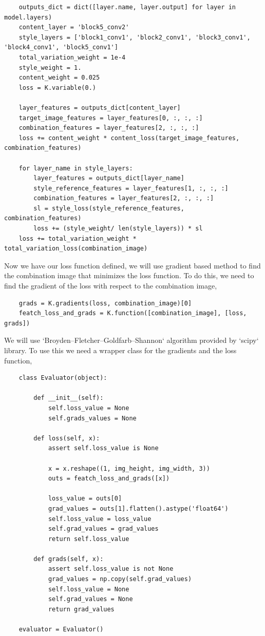 \documentclass[graybox]{svmult}
\begin{document}
\begin{verbatim}
    outputs_dict = dict([layer.name, layer.output] for layer in model.layers)
    content_layer = 'block5_conv2'
    style_layers = ['block1_conv1', 'block2_conv1', 'block3_conv1', 'block4_conv1', 'block5_conv1']
    total_variation_weight = 1e-4
    style_weight = 1.
    content_weight = 0.025
    loss = K.variable(0.)

    layer_features = outputs_dict[content_layer]
    target_image_features = layer_features[0, :, :, :]
    combination_features = layer_features[2, :, :, :]
    loss += content_weight * content_loss(target_image_features, combination_features)

    for layer_name in style_layers:
        layer_features = outputs_dict[layer_name]
        style_reference_features = layer_features[1, :, :, :]
        combination_features = layer_features[2, :, :, :]
        sl = style_loss(style_reference_features, combination_features)
        loss += (style_weight/ len(style_layers)) * sl
    loss += total_variation_weight * total_variation_loss(combination_image)
\end{verbatim}

Now we have our loss function defined, we will use gradient based method to find the combination image that minimizes the loss function. To do this, we need to find the gradient of the loss with respect to the combination image,

\begin{verbatim}
    grads = K.gradients(loss, combination_image)[0]
    featch_loss_and_grads = K.function([combination_image], [loss, grads])
\end{verbatim}

We will use `Broyden–Fletcher–Goldfarb–Shannon` algorithm provided by `scipy` library. To use this we need a wrapper class for the gradients and the loss function,

\begin{verbatim}
    class Evaluator(object):

        def __init__(self):
            self.loss_value = None
            self.grads_values = None

        def loss(self, x):
            assert self.loss_value is None

            x = x.reshape((1, img_height, img_width, 3))
            outs = featch_loss_and_grads([x])

            loss_value = outs[0]
            grad_values = outs[1].flatten().astype('float64')
            self.loss_value = loss_value
            self.grad_values = grad_values
            return self.loss_value

        def grads(self, x):
            assert self.loss_value is not None
            grad_values = np.copy(self.grad_values)
            self.loss_value = None
            self.grad_values = None
            return grad_values

    evaluator = Evaluator()
\end{verbatim}
\end{document}
